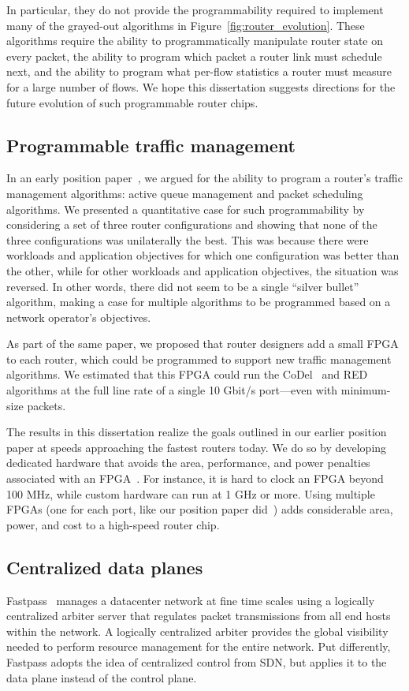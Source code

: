 In particular, they do not provide the programmability required to implement
many of the grayed-out algorithms in Figure~\ref{fig:router_evolution}.  These
algorithms require the ability to programmatically manipulate router state on
every packet, the ability to program which packet a router link must schedule
next, and the ability to program what per-flow statistics a router must measure
for a large number of flows. We hope this dissertation suggests directions for
the future evolution of such programmable router chips.

\subsection{Programmable traffic management}

In an early position paper~\cite{nosilverbullet}, we argued for the ability to
program a router's traffic management algorithms: active queue management and
packet scheduling algorithms. We presented a quantitative case for such
programmability by considering a set of three router configurations and showing
that none of the three configurations was unilaterally the best. This was
because there were workloads and application objectives for which one
configuration was better than the other, while for other workloads and
application objectives, the situation was reversed. In other words, there did
not seem to be a single ``silver bullet'' algorithm, making a case for multiple
algorithms to be programmed based on a network operator's objectives.

As part of the same paper, we proposed that router designers add a small FPGA
to each router, which could be programmed to support new traffic management
algorithms. We estimated that this FPGA could run the CoDel~\cite{codel} and
RED~\cite{red} algorithms at the full line rate of a single 10 Gbit/s
port---even with minimum-size packets.

The results in this dissertation realize the goals outlined in our earlier
position paper at speeds approaching the fastest routers today. We do so by
developing dedicated hardware that avoids the area, performance, and power
penalties associated with an FPGA~\cite{fpga_asic_gap}. For instance, it is
hard to clock an FPGA beyond 100 MHz, while custom hardware can run at 1 GHz or
more. Using multiple FPGAs (\eg one for each port, like our position paper
did~\cite{nosilverbullet}) adds considerable area, power, and cost to a
high-speed router chip.

\subsection{Centralized data planes}
Fastpass~\cite{fastpass} manages a datacenter network at fine time scales using
a logically centralized arbiter server that regulates packet transmissions from all
end hosts within the network. A logically centralized arbiter provides the
global visibility needed to perform resource management for the entire network.
Put differently, Fastpass adopts the idea of centralized control from SDN, but
applies it to the data plane instead of the control plane.

